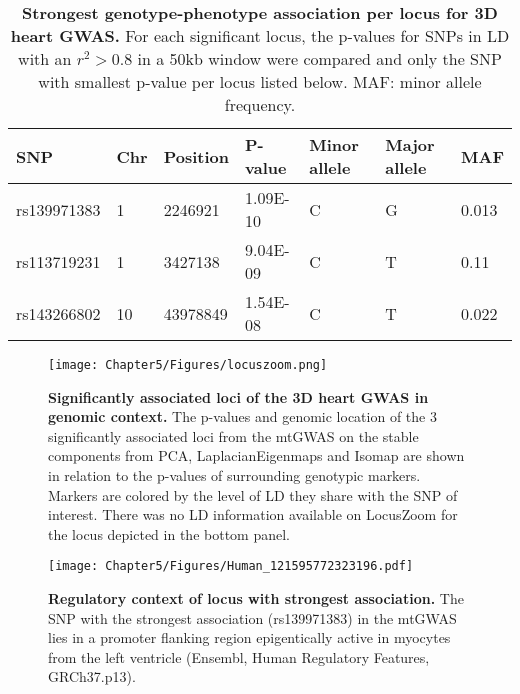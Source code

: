 \begin{table}[htbp]
  \centering
  \caption[\textbf{Strongest genotype-phenotype association per locus for 3D heart GWAS. }]{\textbf{Strongest genotype-phenotype association per locus for 3D heart GWAS. } For each significant locus, the p-values for SNPs in LD with an \(r^2 > 0.8\) in a \num{50}kb window were compared and only the SNP with smallest p-value per locus listed below. MAF: minor allele frequency. }
    \begin{tabular}{lllllll}
    \toprule
    SNP   & Chr   & Position & P-value & Minor allele & Major allele & MAF \\
    \midrule
    rs139971383 & \num{1} & \num{2246921} & \num{1.09E-10} & C     & G     & \num{0.013} \\
    rs113719231 & \num{1} & \num{3427138} & \num{9.04E-09} & C     & T     & \num{0.11} \\
    rs143266802 & \num{10} & \num{43978849} & \num{1.54E-08} & C     & T     & \num{0.022} \\
    \bottomrule
    \end{tabular}%
  \label{tab:gwas-heart}%
\end{table}%


\begin{figure}[hbtp]
	\centering
	\texttt{[image: Chapter5/Figures/locuszoom.png]}
	\caption[\textbf{Significantly associated loci of the 3D heart GWAS in genomic context. }Generated with LocusZoom \citep{Pruim2010}]{\textbf{Significantly associated loci of the 3D heart GWAS in genomic context. }The p-values and genomic location of the \num{3} significantly associated loci from the mtGWAS on the stable components from PCA, LaplacianEigenmaps and Isomap are shown in relation to the p-values of surrounding genotypic markers. Markers are colored by the level of LD they share with the SNP of interest. There was no LD information available on LocusZoom for the locus depicted in the bottom panel.} 
	 	\label{fig:locuszoom-heart}
\end{figure}

\begin{figure}[hbtp]
	\centering
	\texttt{[image: Chapter5/Figures/Human\_121595772323196.pdf]}
	\caption[\textbf{Regulatory context of locus with strongest association. }]{\textbf{Regulatory context of locus with strongest association. } The SNP with the strongest association (rs139971383) in the mtGWAS lies in a promoter flanking region epigentically active in myocytes from the left ventricle (Ensembl, Human Regulatory Features, GRCh37.p13). } 
	 	\label{fig:regulatory-heart}
\end{figure}

